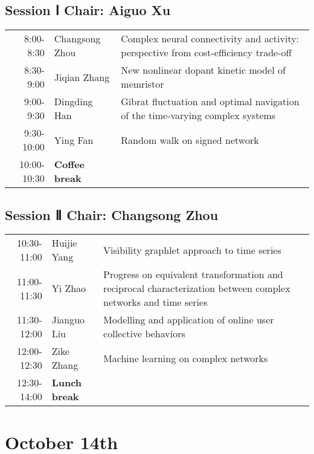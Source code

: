 \documentclass[11pt]{article}
\begin{document}
\subsection*{Session Ⅰ Chair: Aiguo Xu}
\label{sec:org6a340ce}

\begin{center}
\begin{tabular}{rll}
\hline
8:00-8:30 & Changsong Zhou & Complex neural connectivity and activity: perspective from cost-efficiency trade-off\\
8:30-9:00 & Jiqian Zhang & New nonlinear dopant kinetic model of memristor\\
9:00-9:30 & Dingding Han & Gibrat fluctuation and optimal navigation of the time-varying complex systems\\
9:30-10:00 & Ying Fan & Random walk on signed network\\
 10:00-10:30 &  \textbf{Coffee break} & \\
\hline
\end{tabular}
\end{center}


\subsection*{Session Ⅱ Chair: Changsong Zhou}
\label{sec:org8092f52}


\begin{center}
\begin{tabular}{rll}
\hline
10:30-11:00 & Huijie Yang & Visibility graphlet approach to time series\\
11:00-11:30 & Yi Zhao & Progress on equivalent transformation and reciprocal characterization between complex networks and time series\\
11:30-12:00 & Jianguo Liu & Modelling and application of online user collective behaviors\\
12:00-12:30 & Zike Zhang & Machine learning on complex networks\\
 12:30-14:00 &  \textbf{Lunch break} & \\
\hline
\end{tabular}
\end{center}



\newpage

\section*{October 14th}
\label{sec:org2cd79bc}
\end{document}
